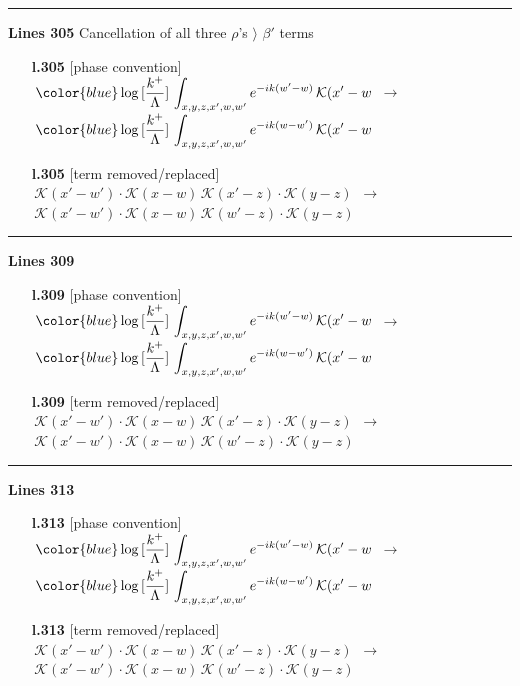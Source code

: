 \documentclass[10pt]{article}
\begin{document}
\noindent\rule{\linewidth}{0.3pt}\par\noindent\textbf{Lines 305} \quad \textsf{Cancellation of all three $\rho$'s $\rangle$ $\beta'$ terms} \par
\begin{itemize}[leftmargin=2.2em,itemsep=1pt,topsep=2pt]
\item[\textbf{l.305}] \textsf{\small [phase convention]} $\displaystyle \,{\color{blue}\log{[\frac{k^{+}}{\Lambda}]}}\,\int_{x,y,z,x',w,w'}e^{-ik(w'-w)}\,\mathcal{K}(x'-w$\ $\longrightarrow$\ $\displaystyle \,{\color{blue}\log{[\frac{k^{+}}{\Lambda}]}}\,\int_{x,y,z,x',w,w'}e^{-ik(w-w')}\,\mathcal{K}(x'-w$
\item[\textbf{l.305}] \textsf{\small [term removed/replaced]} $\displaystyle \,\mathcal{K}(x'-w')\cdot\mathcal{K}(x-w)\,\mathcal{K}(x'-z)\cdot\mathcal{K}(y-z)$\ $\longrightarrow$\ $\displaystyle \,\mathcal{K}(x'-w')\cdot\mathcal{K}(x-w)\,\mathcal{K}(w'-z)\cdot\mathcal{K}(y-z)$
\end{itemize}
\noindent\rule{\linewidth}{0.3pt}\par\noindent\textbf{Lines 309} \par
\begin{itemize}[leftmargin=2.2em,itemsep=1pt,topsep=2pt]
\item[\textbf{l.309}] \textsf{\small [phase convention]} $\displaystyle \,{\color{blue}\log{[\frac{k^{+}}{\Lambda}]}}\,\int_{x,y,z,x',w,w'}e^{-ik(w'-w)}\,\mathcal{K}(x'-w$\ $\longrightarrow$\ $\displaystyle \,{\color{blue}\log{[\frac{k^{+}}{\Lambda}]}}\,\int_{x,y,z,x',w,w'}e^{-ik(w-w')}\,\mathcal{K}(x'-w$
\item[\textbf{l.309}] \textsf{\small [term removed/replaced]} $\displaystyle \,\mathcal{K}(x'-w')\cdot\mathcal{K}(x-w)\,\mathcal{K}(x'-z)\cdot\mathcal{K}(y-z)$\ $\longrightarrow$\ $\displaystyle \,\mathcal{K}(x'-w')\cdot\mathcal{K}(x-w)\,\mathcal{K}(w'-z)\cdot\mathcal{K}(y-z)$
\end{itemize}
\noindent\rule{\linewidth}{0.3pt}\par\noindent\textbf{Lines 313} \par
\begin{itemize}[leftmargin=2.2em,itemsep=1pt,topsep=2pt]
\item[\textbf{l.313}] \textsf{\small [phase convention]} $\displaystyle \,{\color{blue}\log{[\frac{k^{+}}{\Lambda}]}}\,\int_{x,y,z,x',w,w'}e^{-ik(w'-w)}\,\mathcal{K}(x'-w$\ $\longrightarrow$\ $\displaystyle \,{\color{blue}\log{[\frac{k^{+}}{\Lambda}]}}\,\int_{x,y,z,x',w,w'}e^{-ik(w-w')}\,\mathcal{K}(x'-w$
\item[\textbf{l.313}] \textsf{\small [term removed/replaced]} $\displaystyle \,\mathcal{K}(x'-w')\cdot\mathcal{K}(x-w)\,\mathcal{K}(x'-z)\cdot\mathcal{K}(y-z)$\ $\longrightarrow$\ $\displaystyle \,\mathcal{K}(x'-w')\cdot\mathcal{K}(x-w)\,\mathcal{K}(w'-z)\cdot\mathcal{K}(y-z)$
\end{itemize}
\bigskip
\end{document}
